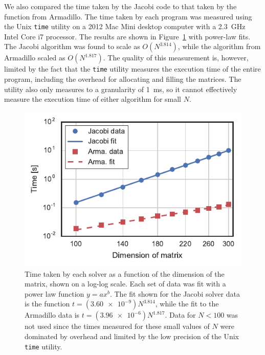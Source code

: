 \documentclass[aps,prc,reprint,nobalancelastpage]{revtex4-1}
\begin{document}
        We also compared the time taken by the Jacobi code to that taken by the function from Armadillo. The time taken by each program was measured using the Unix \texttt{time} utility on a 2012 Mac Mini desktop computer with a \SI{2.3}{GHz} Intel Core i7 processor. The results are shown in Figure~\ref{fig:times} with power-law fits. The Jacobi algorithm was found to scale as $O(N^{3.814})$, while the algorithm from Armadillo scaled as $O(N^{1.817})$. The quality of this measurement is, however, limited by the fact that the \texttt{time} utility measures the execution time of the entire program, including the overhead for allocating and filling the matrices. The utility also only measures to a granularity of \SI{1}{ms}, so it cannot effectively measure the execution time of either algorithm for small $N$.

        \begin{figure}
            \includegraphics{timing.pdf}
            \caption{Time taken by each solver as a function of the dimension of the matrix, shown on a log-log scale. Each set of data was fit with a power law function $y=ax^b$. The fit shown for the Jacobi solver data is the function $t=(\num{3.60e-9}) N^{3.814}$, while the fit to the Armadillo data is $t=(\num{3.96e-6}) N^{1.817}$. Data for $N<100$ was not used since the times measured for these small values of $N$ were dominated by overhead and limited by the low precision of the Unix \texttt{time} utility.}
            \label{fig:times}
        \end{figure}
\end{document}
